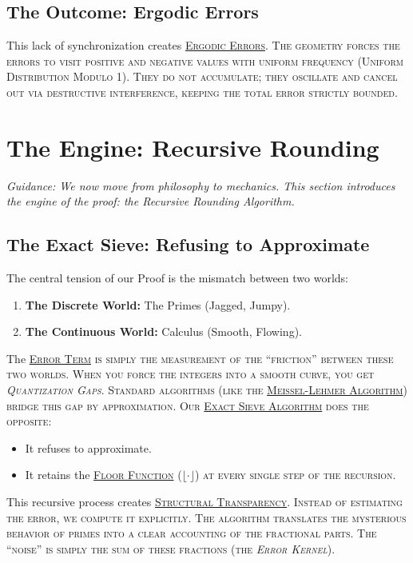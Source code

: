 \documentclass[sn-mathphys-num, pdflatex]{sn-jnl}
\newcommand{\gterm}[2]{\begingroup\normalfont\scshape\hyperlink{#1}{#2}\endgroup}
\begin{document}
\subsection{The Outcome: Ergodic Errors}
This lack of synchronization creates \gterm{ergodic_errors}{Ergodic Errors}. The geometry forces the errors to visit positive and negative values with uniform frequency (Uniform Distribution Modulo 1). They do not accumulate; they oscillate and cancel out via destructive interference, keeping the total error strictly bounded.
\section{The Engine: Recursive Rounding}
\label{sec:engine}

\textit{Guidance: We now move from philosophy to mechanics. This section introduces the engine of the proof: the Recursive Rounding Algorithm.} 

\subsection{The Exact Sieve: Refusing to Approximate}

The central tension of our Proof is the mismatch between two worlds:
\begin{enumerate}
    \item \textbf{The Discrete World:} The Primes (Jagged, Jumpy).
    \item \textbf{The Continuous World:} Calculus (Smooth, Flowing).
\end{enumerate}
The \gterm{error_term}{Error Term} is simply the measurement of the ``friction'' between these two worlds. When you force the integers into a smooth curve, you get \textit{Quantization Gaps}. Standard algorithms (like the \gterm{meissel_lehmer}{Meissel-Lehmer Algorithm}) bridge this gap by approximation. Our \gterm{exact_sieve}{Exact Sieve Algorithm} does the opposite:
\begin{itemize}
    \item It refuses to approximate.
    \item It retains the \gterm{floor_function}{Floor Function} ($\lfloor \cdot \rfloor$) at every single step of the recursion.
\end{itemize}

This recursive process creates \gterm{structural_transparency}{Structural Transparency}. Instead of estimating the error, we compute it explicitly. The algorithm translates the mysterious behavior of primes into a clear accounting of the fractional parts. The ``noise'' is simply the sum of these fractions (the \textit{Error Kernel}).
\end{document}
